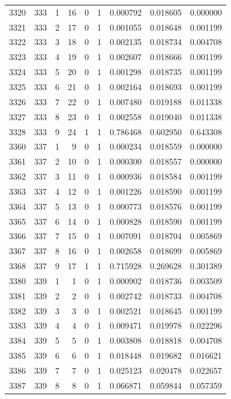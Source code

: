 \begin{longtable}{rrrrrrrrr}
3320 & 333 & 1 & 16 & 0 & 1 & 0.000792 & 0.018605 & 0.000000 \\
3321 & 333 & 2 & 17 & 0 & 1 & 0.001055 & 0.018648 & 0.001199 \\
3322 & 333 & 3 & 18 & 0 & 1 & 0.002135 & 0.018734 & 0.004708 \\
3323 & 333 & 4 & 19 & 0 & 1 & 0.002607 & 0.018666 & 0.001199 \\
3324 & 333 & 5 & 20 & 0 & 1 & 0.001298 & 0.018735 & 0.001199 \\
3325 & 333 & 6 & 21 & 0 & 1 & 0.002164 & 0.018693 & 0.001199 \\
3326 & 333 & 7 & 22 & 0 & 1 & 0.007480 & 0.019188 & 0.011338 \\
3327 & 333 & 8 & 23 & 0 & 1 & 0.002558 & 0.019040 & 0.011338 \\
3328 & 333 & 9 & 24 & 1 & 1 & 0.786468 & 0.602950 & 0.643308 \\
3360 & 337 & 1 & 9 & 0 & 1 & 0.000234 & 0.018559 & 0.000000 \\
3361 & 337 & 2 & 10 & 0 & 1 & 0.000300 & 0.018557 & 0.000000 \\
3362 & 337 & 3 & 11 & 0 & 1 & 0.000936 & 0.018584 & 0.001199 \\
3363 & 337 & 4 & 12 & 0 & 1 & 0.001226 & 0.018590 & 0.001199 \\
3364 & 337 & 5 & 13 & 0 & 1 & 0.000773 & 0.018576 & 0.001199 \\
3365 & 337 & 6 & 14 & 0 & 1 & 0.000828 & 0.018590 & 0.001199 \\
3366 & 337 & 7 & 15 & 0 & 1 & 0.007091 & 0.018704 & 0.005869 \\
3367 & 337 & 8 & 16 & 0 & 1 & 0.002658 & 0.018699 & 0.005869 \\
3368 & 337 & 9 & 17 & 1 & 1 & 0.715928 & 0.269628 & 0.301389 \\
3380 & 339 & 1 & 1 & 0 & 1 & 0.000902 & 0.018736 & 0.003509 \\
3381 & 339 & 2 & 2 & 0 & 1 & 0.002742 & 0.018733 & 0.004708 \\
3382 & 339 & 3 & 3 & 0 & 1 & 0.002521 & 0.018645 & 0.001199 \\
3383 & 339 & 4 & 4 & 0 & 1 & 0.009471 & 0.019978 & 0.022296 \\
3384 & 339 & 5 & 5 & 0 & 1 & 0.003808 & 0.018818 & 0.004708 \\
3385 & 339 & 6 & 6 & 0 & 1 & 0.018448 & 0.019682 & 0.016621 \\
3386 & 339 & 7 & 7 & 0 & 1 & 0.025123 & 0.020478 & 0.022657 \\
3387 & 339 & 8 & 8 & 0 & 1 & 0.066871 & 0.059844 & 0.057359 \\

\end{longtable}
